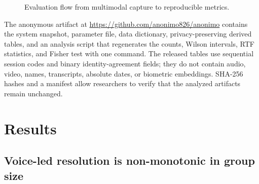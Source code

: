 \documentclass[conference]{IEEEtran}
\begin{document}
\begin{figure}[h]
\centering
{}
\caption{Evaluation flow from multimodal capture to reproducible metrics.}
\label{fig:evaluation-flow}
\end{figure}

The anonymous artifact at
\url{https://github.com/anonimo826/anonimo} contains the system snapshot,
parameter file, data dictionary, privacy-preserving derived tables, and
an analysis script that regenerates the counts, Wilson intervals, RTF
statistics, and Fisher test with one command. The released tables use
sequential session codes and binary identity-agreement fields; they do
not contain audio, video, names, transcripts, absolute dates, or
biometric embeddings. SHA-256 hashes and a manifest allow researchers
to verify that the analyzed artifacts remain unchanged.

\section{Results}
\label{sec:results}

\subsection{Voice-led resolution is non-monotonic in group size}
\label{sec:bysize}
\end{document}
